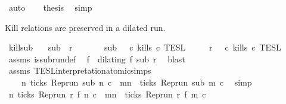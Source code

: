 \begin{isabellebody}
\ auto\isanewline
\ \ \isamarkupfalse%
\ {\isacharquery}thesis\ \isamarkupfalse%
\ simp\isanewline
{}\isamarkupfalse%
%
\endisatagproof
{\isafoldproof}%
%
\isadelimproof
%
\endisadelimproof
%
\begin{isamarkuptext}%
Kill relations are preserved in a dilated run.%
\end{isamarkuptext}\isamarkuptrue%
\isamarkupfalse%
\ kill{\isacharunderscore}sub{\isacharcolon}\isanewline
\ \ \ {\isacartoucheopen}sub\ {\isasymlless}\ r{\isacartoucheclose}\isanewline
\ \ \ \ \ \ \ {\isacartoucheopen}sub\ {\isasymin}\ {\isasymlbrakk}\ c\ kills\ c\ {\isasymrbrakk}\isactrlsub T\isactrlsub E\isactrlsub S\isactrlsub L{\isacartoucheclose}\isanewline
\ \ \ \ \ {\isacartoucheopen}r\ {\isasymin}\ {\isasymlbrakk}\ c\ kills\ c\ {\isasymrbrakk}\isactrlsub T\isactrlsub E\isactrlsub S\isactrlsub L{\isacartoucheclose}\isanewline
%
\isadelimproof
%
\endisadelimproof
%
\isatagproof
{}\isamarkupfalse%
\ {\isacharminus}\isanewline
\ \ \isamarkupfalse%
\ assms{\isacharparenleft}{}{\isacharparenright}\ is{\isacharunderscore}subrun{\isacharunderscore}def\ \isamarkupfalse%
\ f\ \ {\isacharasterisk}{\isacharcolon}{\isacartoucheopen}dilating\ f\ sub\ r{\isacartoucheclose}\ \isamarkupfalse%
\ blast\isanewline
\ \ \isamarkupfalse%
\ assms{\isacharparenleft}{}{\isacharparenright}\ TESL{\isacharunderscore}interpretation{\isacharunderscore}atomic{\isachardot}simps{\isacharparenleft}{}{\isacharparenright}\ \isamarkupfalse%
\isanewline
\ \ \ \ {\isacartoucheopen}{\isasymforall}n{\isachardot}\ ticks\ {\isacharparenleft}Rep{\isacharunderscore}run\ sub\ n\ c\ {\isasymlongrightarrow}\ {\isacharparenleft}{\isasymforall}m{\isasymge}n{\isachardot}\ {\isasymnot}\ ticks\ {\isacharparenleft}Rep{\isacharunderscore}run\ sub\ m\ c\ \isamarkupfalse%
\ simp\isanewline
\ \ \isamarkupfalse%
\ {}{\isacharcolon}{\isacartoucheopen}{\isasymforall}n{\isachardot}\ ticks\ {\isacharparenleft}Rep{\isacharunderscore}run\ r\ {\isacharparenleft}f\ n{\isacharparenright}\ c\ {\isasymlongrightarrow}\ {\isacharparenleft}{\isasymforall}m{\isasymge}n{\isachardot}\ {\isasymnot}\ ticks\ {\isacharparenleft}Rep{\isacharunderscore}run\ r\ {\isacharparenleft}f\ m{\isacharparenright}\ c\isanewline

\end{isabellebody}
